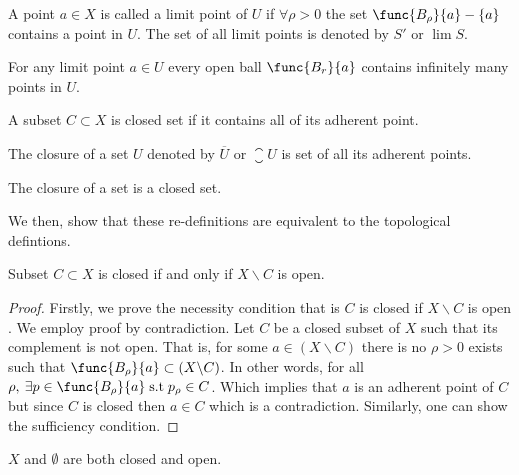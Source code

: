 \begin{definition} 
    A point \(a \in X\) is called a limit point of \(U\) if \(\forall \rho > 0\) the set \(\func{B_\rho}{a} - \{ a\}\) contains a point in \(U\). The set of all limit points is denoted by \(S'\) or \(\lim S\).
\end{definition}

\begin{note}
    For any limit point \(a \in U\) every open ball \(\func{B_r}{a}\) contains infinitely many points in \(U\).
\end{note}

\begin{definition} 
    A subset \(C \subset X\) is closed set if it contains all of its adherent point.
\end{definition}

\begin{definition} [Closure]
    The closure of a set \(U\) denoted by \(\overline{U}\) or \(\closure U\) is set of all its adherent points.
\end{definition}

\begin{note}
    The closure of a set is a closed set.
\end{note}

We then, show that these re-definitions are equivalent to the topological defintions.

\begin{theorem}
    Subset \(C \subset X\) is closed if and only if \(X \backslash C\) is open.
\end{theorem}

\begin{proof}
    Firstly, we prove the necessity condition that is \(C\) is closed if \(X \backslash C\) is open . We employ proof by contradiction. Let \(C\) be a closed subset of \(X\) such that its complement is not open. That is, for some \(a \in (X \backslash C)\) there is no \(\rho > 0\) exists such that \(\func{B_\rho}{a} \subset (X \backslash C)\). In other words, for all \(\rho,\: \exists p \in \func{B_\rho}{a} \;\mathrm{ s.t }\; p_\rho \in C\). Which implies that \(a\) is an adherent point of \(C\) but since \(C\) is closed then \(a \in C\) which is a contradiction. Similarly, one can show the sufficiency condition.
\end{proof}

\begin{corollary}
    \(X\)  and \(\emptyset\) are both closed and open.
\end{corollary}

